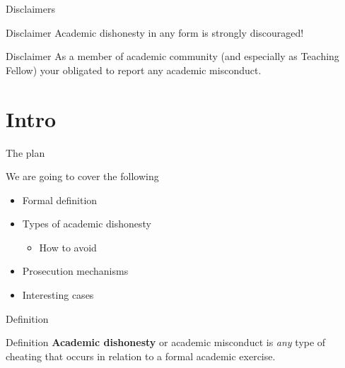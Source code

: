 
\begin{frame}{Disclaimers}
	
	\begin{alertblock}{Disclaimer}
		Academic dishonesty in any form is strongly discouraged!
	\end{alertblock}

	\begin{alertblock}{Disclaimer}
		As a member of academic community (and especially as Teaching Fellow) your obligated to report any academic misconduct.
	\end{alertblock}

\end{frame}

\section{Intro}

	\begin{frame}{The plan}
		
		We are going to cover the following

		\begin{itemize}
			\item
				Formal definition
			\item 
				Types of academic dishonesty
				\begin{itemize}
					\item 
						How to avoid
				\end{itemize}
			\item 
				Prosecution mechanisms
			\item
				Interesting cases
		\end{itemize}

	\end{frame}

	\begin{frame}{Definition}
		
		\begin{block}{Definition}
			\textbf{Academic dishonesty} or academic misconduct is \emph{any} type of cheating that occurs in relation to a formal academic exercise.
		\end{block}	

	\end{frame}

